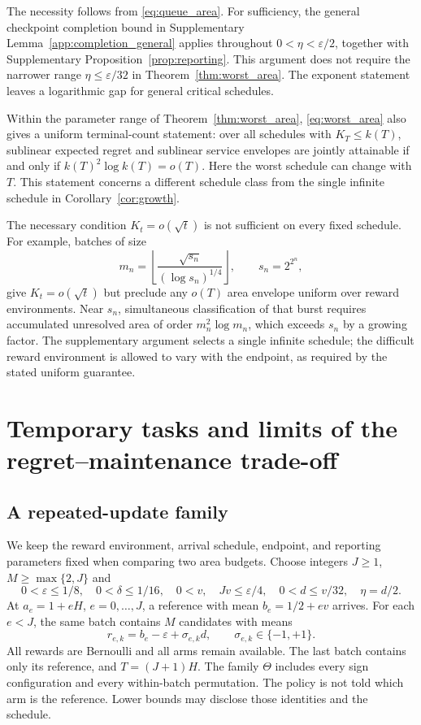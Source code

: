 \documentclass[11pt]{article}
\theoremstyle{remark}
\begin{document}
The necessity follows from \eqref{eq:queue_area}. For sufficiency, the general
checkpoint completion bound in Supplementary Lemma~\ref{app:completion_general}
applies throughout $0<\eta<\varepsilon/2$, together with
Supplementary Proposition~\ref{prop:reporting}. This argument does not require the narrower
range $\eta\le\varepsilon/32$ in Theorem~\ref{thm:worst_area}. The exponent
statement leaves a logarithmic gap for general critical schedules.

Within the parameter range of Theorem~\ref{thm:worst_area},
\eqref{eq:worst_area} also gives a uniform terminal-count statement: over all
schedules with $K_T\le k(T)$, sublinear expected regret and sublinear service
envelopes are jointly attainable if and only if
$k(T)^2\log k(T)=o(T)$. Here the worst schedule can change with $T$.
This statement concerns a different schedule class from the single infinite
schedule in Corollary~\ref{cor:growth}.

The necessary condition $K_t=o(\sqrt t)$ is not sufficient on every fixed
schedule. For example, batches of size
\[
 m_n=\left\lfloor\frac{\sqrt{s_n}}{(\log s_n)^{1/4}}\right\rfloor,
 \qquad s_n=2^{2^n},
\]
give $K_t=o(\sqrt t)$ but preclude any $o(T)$ area envelope uniform over
reward environments. Near $s_n$, simultaneous classification of that burst
requires accumulated unresolved area of order $m_n^2\log m_n$, which exceeds
$s_n$ by a growing factor. The supplementary argument selects a single
infinite schedule; the difficult reward environment is allowed to vary with
the endpoint, as required by the stated uniform guarantee.

\section{Temporary tasks and limits of the regret--maintenance trade-off}
\label{sec:tradeoff}

\subsection{A repeated-update family}

We keep the reward environment, arrival schedule, endpoint, and reporting
parameters fixed when comparing two area budgets. Choose integers $J\ge1$,
$M\ge\max\{2,J\}$ and
\begin{equation}
 0<\varepsilon\le1/8,\quad 0<\delta\le1/16,\quad
 0<v,\quad Jv\le\varepsilon/4,\quad 0<d\le v/32,\quad\eta=d/2.
 \label{eq:family_parameters}
\end{equation}
At $a_e=1+eH$, $e=0,\ldots,J$, a reference with mean $b_e=1/2+ev$
arrives. For each $e<J$, the same batch contains $M$ candidates with means
\begin{equation}
 r_{e,k}=b_e-\varepsilon+\sigma_{e,k}d,
           \qquad \sigma_{e,k}\in\{-1,+1\}.
 \label{eq:family_means}
\end{equation}
All rewards are Bernoulli and all arms remain available. The last batch
contains only its reference, and $T=(J+1)H$. The family $\Theta$ includes
every sign configuration and every within-batch permutation. The policy is
not told which arm is the reference. Lower bounds may disclose those
identities and the schedule.
\end{document}
